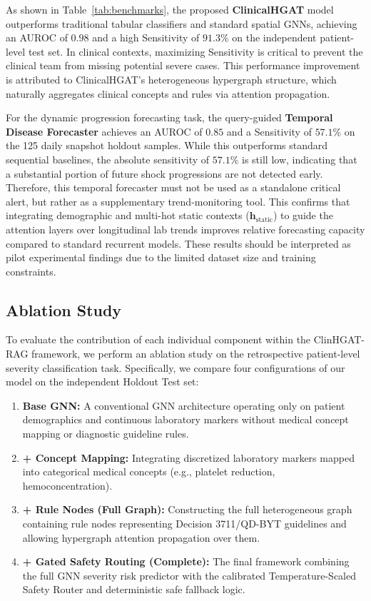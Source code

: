 \documentclass[conference]{IEEEtran}
\begin{document}
As shown in Table~\ref{tab:benchmarks}, the proposed \textbf{ClinicalHGAT} model outperforms traditional tabular classifiers and standard spatial GNNs, achieving an AUROC of $0.98$ and a high Sensitivity of $91.3\%$ on the independent patient-level test set. In clinical contexts, maximizing Sensitivity is critical to prevent the clinical team from missing potential severe cases. This performance improvement is attributed to ClinicalHGAT's heterogeneous hypergraph structure, which naturally aggregates clinical concepts and rules via attention propagation.

For the dynamic progression forecasting task, the query-guided \textbf{Temporal Disease Forecaster} achieves an AUROC of $0.85$ and a Sensitivity of $57.1\%$ on the 125 daily snapshot holdout samples. While this outperforms standard sequential baselines, the absolute sensitivity of $57.1\%$ is still low, indicating that a substantial portion of future shock progressions are not detected early. Therefore, this temporal forecaster must not be used as a standalone critical alert, but rather as a supplementary trend-monitoring tool. This confirms that integrating demographic and multi-hot static contexts ($\mathbf{h}_{\text{static}}$) to guide the attention layers over longitudinal lab trends improves relative forecasting capacity compared to standard recurrent models. These results should be interpreted as pilot experimental findings due to the limited dataset size and training constraints.

\subsection{Ablation Study}
To evaluate the contribution of each individual component within the ClinHGAT-RAG framework, we perform an ablation study on the retrospective patient-level severity classification task. Specifically, we compare four configurations of our model on the independent Holdout Test set:
\begin{enumerate}
    \item \textbf{Base GNN:} A conventional GNN architecture operating only on patient demographics and continuous laboratory markers without medical concept mapping or diagnostic guideline rules.
    \item \textbf{+ Concept Mapping:} Integrating discretized laboratory markers mapped into categorical medical concepts (e.g., platelet reduction, hemoconcentration).
    \item \textbf{+ Rule Nodes (Full Graph):} Constructing the full heterogeneous graph containing rule nodes representing Decision 3711/QD-BYT guidelines and allowing hypergraph attention propagation over them.
    \item \textbf{+ Gated Safety Routing (Complete):} The final framework combining the full GNN severity risk predictor with the calibrated Temperature-Scaled Safety Router and deterministic safe fallback logic.
\end{enumerate}
\end{document}

